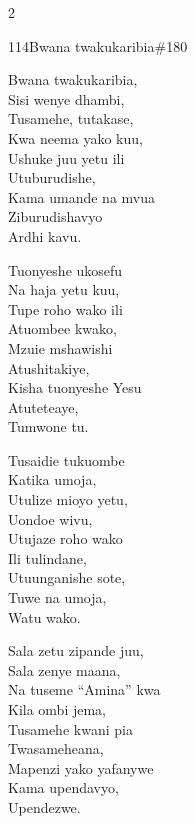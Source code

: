 \documentclass{article}
\begin{document}
\begin{multicols}{2}
\begin{hymn}{114}{Bwana twakukaribia}{\#180}
\begin{stanza}
Bwana twakukaribia,\\
Sisi wenye dhambi,\\
Tusamehe, tutakase,\\
Kwa neema yako kuu,\\
Ushuke juu yetu ili\\
Utuburudishe,\\
Kama umande na mvua\\
Ziburudishavyo\\
Ardhi kavu.
\end{stanza}
\begin{stanza}
Tuonyeshe ukosefu\\
Na haja yetu kuu,\\
Tupe roho wako ili\\
Atuombee kwako,\\
Mzuie mshawishi\\
Atushitakiye,\\
Kisha tuonyeshe Yesu\\
Atuteteaye,\\
Tumwone tu.
\end{stanza}
\begin{stanza}
Tusaidie tukuombe\\
Katika umoja,\\
Utulize mioyo yetu,\\
Uondoe wivu,\\
Utujaze roho wako\\
Ili tulindane,\\
Utuunganishe sote,\\
Tuwe na umoja,\\
Watu wako.
\end{stanza}
\begin{stanza}
Sala zetu zipande juu,\\
Sala zenye maana,\\
Na tuseme ``Amina'' kwa\\
Kila ombi jema,\\
Tusamehe kwani pia\\
Twasameheana,\\
Mapenzi yako yafanywe\\
Kama upendavyo,\\
Upendezwe.
\end{stanza}
\end{hymn}


\end{multicols}
\end{document}
